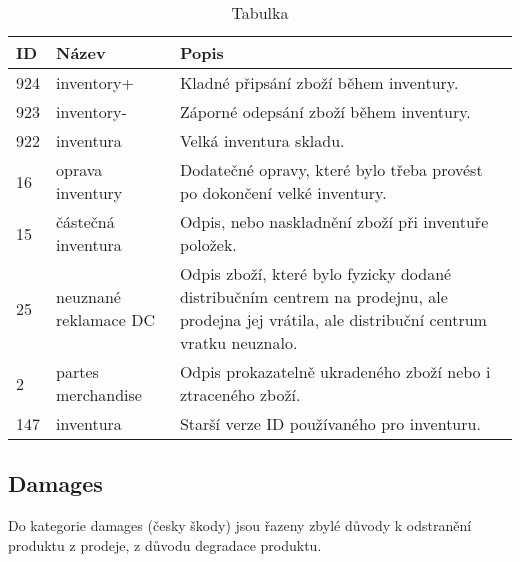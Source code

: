 \begin{table}[]
    \caption{Tabulka}

    \begin{tabular}{p{1cm} p{4cm} p{9cm}}
    ID  & Název             & Popis \\
    \hline
    924          & inventory+             & Kladné připsání zboží během inventury.      \\
    923          & inventory-             & Záporné odepsání zboží během inventury.      \\
    922          & inventura              & Velká inventura skladu.     \\
    16           & oprava inventury       & Dodatečné opravy, které bylo třeba provést po dokončení velké inventury.      \\
    15           & částečná inventura     & Odpis, nebo naskladnění zboží při inventuře položek.      \\
    25           & neuznané reklamace DC    &  Odpis zboží, které bylo fyzicky dodané distribučním centrem na prodejnu, ale prodejna jej vrátila, ale distribuční centrum vratku neuznalo.     \\
    2            & partes merchandise     & Odpis prokazatelně ukradeného zboží nebo i ztraceného zboží.      \\
    147          & inventura              & Starší verze ID používaného pro inventuru.
    \end{tabular}
\end{table}


\subsection*{Damages}

Do kategorie damages (česky škody) jsou řazeny zbylé důvody k odstranění produktu z prodeje, z důvodu degradace produktu. 

